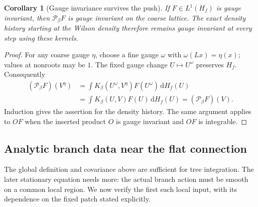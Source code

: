 \documentclass[11pt,reqno]{amsart}
\numberwithin{equation}{section}
\newtheorem{corollary}[theorem]{Corollary}
\theoremstyle{definition}
\theoremstyle{remark}
\newcommand{\dd}{\mathrm d}
\begin{document}
\begin{corollary}[Gauge invariance survives the push]
\label{cor:pushed-gauge-invariance}
If \(F\in L^1(H_f)\) is gauge invariant, then
\(\mathcal P_\beta F\) is gauge invariant on the coarse lattice.
The exact density history starting at the Wilson density therefore
remains gauge invariant at every step using these kernels.
\end{corollary}
\begin{proof}
For any coarse gauge \(\eta\), choose a fine gauge \(\omega\)
with \(\omega(Lx)=\eta(x)\); values at nonroots may be \(1\).
The fixed gauge change \(U\mapsto U^\omega\) preserves \(H_f\).
Consequently
\begin{align*}
 (\mathcal P_\beta F)(V^\eta)
   &=\int K_\beta(U^\omega,V^\eta)F(U^\omega)\,\dd H_f(U)\\
   &=\int K_\beta(U,V)F(U)\,\dd H_f(U)
     =(\mathcal P_\beta F)(V).
\end{align*}
Induction gives the assertion for the density history. The same
argument applies to \(OF\) when the inserted product \(O\) is
gauge invariant and \(OF\) is integrable.
\end{proof}

\subsection{Analytic branch data near the flat connection}

The global definition and covariance above are sufficient for tree
integration. The later stationary equation needs more: the actual
branch action must be smooth on a common local region. We now
verify the first such local input, with its dependence on the fixed
patch stated explicitly.
\end{document}
